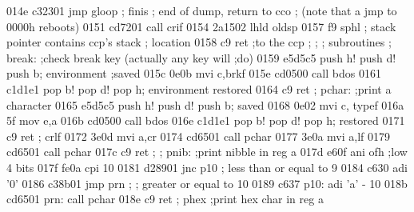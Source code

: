 014e c32301                          jmp  gloop
                            ;
                            finis
                            ;        end of dump, return to cco
                            ;        (note that a jmp to 0000h reboots)
0151 cd7201                          call crif
0154 2a1502                          lhld oldsp
0157 f9                              sphl
                            ;        stack pointer contains ccp's stack
                            ;        location
0158 c9                              ret            ;to the ccp
                            ;
                            ;
                            ;        subroutines
                            ;
                            break:   ;check break key (actually any key will
                                     ;do)
0159 e5d5c5                          push h! push d! push b; environment
                                     ;saved
015c 0e0b                            mvi  c,brkf
015e cd0500                          call bdos
0161 c1d1e1                          pop b! pop d! pop h; environment
                                     restored
0164 c9                              ret
                            ;
                            pchar:   ;print a character
0165 e5d5c5                          push h! push d! push b; saved
0168 0e02                            mvi  c, typef
016a 5f                              mov  e,a
016b cd0500                          call bdos
016e c1d1e1                          pop b! pop d! pop h; restored
0171 c9                              ret
                            ;
                            crlf
0172 3e0d                            mvi  a,cr
0174 cd6501                          call pchar
0177 3e0a                            mvi  a,lf
0179 cd6501                          call pchar
017c c9                              ret
                            ;
                            ;
                            pnib:    ;print nibble in reg a
017d e60f                            ani  ofh       ;low 4 bits
017f fe0a                            cpi  10
0181 d28901                          jnc  p10
                            ;        less than or equal to 9
0184 c630                            adi  '0'
0186 c38b01                          jmp  prn
                            ;
                            ;        greater or equal to 10
0189 c637                   p10:     adi  'a' - 10
018b cd6501                 prn:     call pchar
018e c9                              ret
                            ;
                            phex     ;print hex char in reg a
